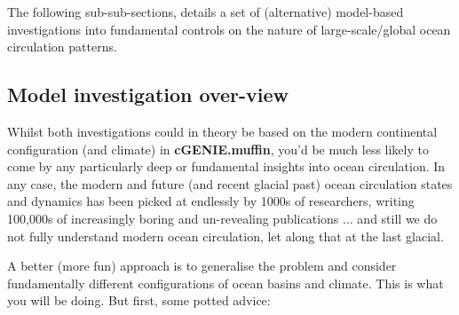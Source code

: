 \documentclass[11pt,fleqn]{book} %
\begin{document}

The following sub-sub-sections, details a set of (alternative) model-based investigations into fundamental controls on the nature of large-scale/global ocean circulation patterns.


\subsection{Model investigation over-view}

Whilst both investigations could in theory be based on the modern continental configuration (and climate) in \textbf{cGENIE.muffin}, you'd be much less likely to come by any particularly deep or fundamental insights into ocean circulation. In any case, the modern and future (and recent glacial past) ocean circulation states and dynamics has been picked at endlessly by 1000s of researchers, writing 100,000s of increasingly boring and un-revealing publications ... and still we do not fully understand modern ocean circulation, let along that at the last glacial. 

A better (more fun) approach is to generalise the problem and consider fundamentally different configurations of ocean basins and climate. This is what you will be doing. But first, some potted advice:
\end{document}
